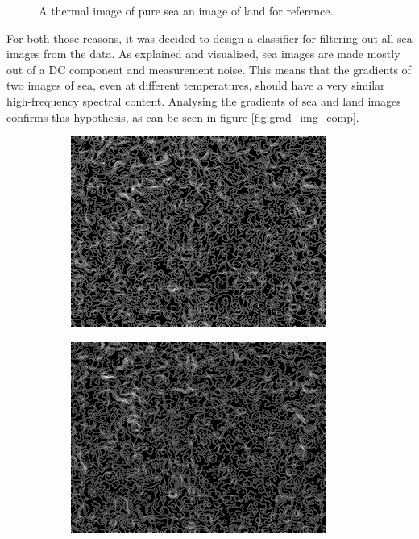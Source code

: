 \begin{figure}[H]
\begin{subfigure}[b]{0.49\textwidth}
        \label{fig:land}
    \end{subfigure}
    \caption{A thermal image of pure sea \vs an image of land for reference.}
    \label{fig:sea_image}
\end{figure}

For both those reasons, it was decided to design a classifier for filtering out all sea images from the data.
As explained and visualized, sea images are made mostly out of a DC component and measurement noise.
This means that the gradients of two images of sea, even at different temperatures, should have a very similar high-frequency spectral content.
Analysing the gradients of sea and land images confirms this hypothesis, as can be seen in figure \ref{fig:grad_img_comp}.
\begin{figure}[H]
    \begin{subfigure}[b]{0.32\textwidth}
        \centering
        \includegraphics[width=\textwidth]{../figs/data/sea_grad-ref.png}
        \label{fig:sea_grad-ref}
    \end{subfigure}
    \hfill    
    \begin{subfigure}[b]{0.32\textwidth}
        \centering
        \includegraphics[width=\textwidth]{../figs/data/sea_grad.png}

\end{subfigure}
\end{figure}
